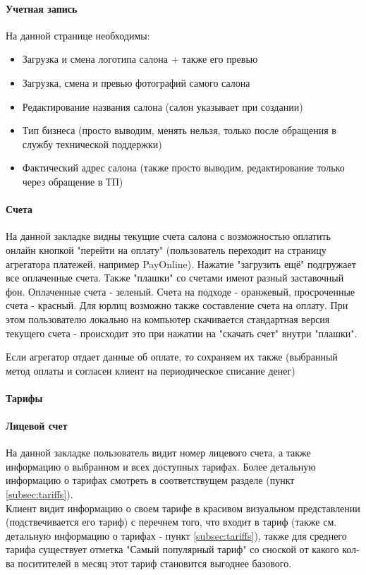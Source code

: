 \documentclass[DIV=calc, paper=a4, fontsize=11pt]{scrartcl} %
\begin{document}
\paragraph{Учетная запись}
На данной странице необходимы:

\begin{itemize}
	\item Загрузка и смена логотипа салона + также его превью
	\item Загрузка, смена и превью фотографий самого салона
	\item Редактирование названия салона (салон указывает при создании)
	\item Тип бизнеса (просто выводим, менять нельзя, только после обращения в службу технической поддержки)
	\item Фактический адрес салона (также просто выводим, редактирование только через обращение в ТП)
\end{itemize}

\paragraph{Счета}

На данной закладке видны текущие счета салона с возможностью оплатить онлайн кнопкой "перейти на оплату" (пользователь переходит на страницу агрегатора платежей, например PayOnline). Нажатие "загрузить ещё" подгружает все оплаченные счета. Также "плашки" со счетами имеют разный заставочный фон. Оплаченные счета - зеленый. Счета на подходе - оранжевый, просроченные счета - красный. Для юрлиц возможно также составление счета на оплату. При этом пользователю локально на компьютер скачивается стандартная версия текущего счета - происходит это при нажатии на "скачать счет" внутри "плашки".

Если агрегатор отдает данные об оплате, то сохраняем их также (выбранный метод оплаты и согласен клиент на периодическое списание денег)

\paragraph{Тарифы}

\paragraph{Лицевой счет}
На данной закладке пользователь видит номер лицевого счета, а также информацию о выбранном и всех доступных тарифах. Более детальную информацию о тарифах смотреть в соответствущем разделе (пункт \ref{subsec:tariffs}).
\\[0.5cm]
Клиент видит информацию о своем тарифе в красивом визуальном представлении (подствечивается его тариф) с перечнем того, что входит в тариф (также см. детальную информацию о тарифах - пункт \ref{subsec:tariffs}), также для среднего тарифа существует отметка "Самый популярный тариф" со сноской от какого кол-ва поситителей в месяц этот тариф становится выгоднее базового.
\end{document}
